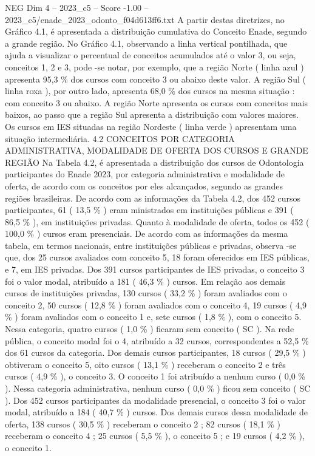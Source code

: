 \begin{textsample}{NEG Dim 4 – 2023\_c5 – Score -1.00 – 2023\_c5/enade\_2023\_odonto\_f04d613ff6.txt}
A partir destas diretrizes, no Gráfico 4.1, é apresentada a distribuição cumulativa do Conceito Enade, segundo a grande região.
No Gráfico 4.1, observando a linha vertical pontilhada, que ajuda a visualizar o percentual de conceitos acumulados até o valor 3, ou seja, conceitos 1, 2 e 3, pode -se notar, por exemplo, que a região Norte ( linha azul ) apresenta 95,3 \% dos cursos com conceito 3 ou abaixo deste valor.
A região Sul ( linha roxa ), por outro lado, apresenta 68,0 \% dos cursos na mesma situação : com conceito 3 ou abaixo.
A região Norte apresenta os cursos com conceitos mais baixos, ao passo que a região Sul apresenta a distribuição com valores maiores.
Os cursos em IES situadas na região Nordeste ( linha verde ) apresentam uma situação intermediária. 4.2 CONCEITOS POR CATEGORIA ADMINISTRATIVA, MODALIDADE DE OFERTA DOS CURSOS E GRANDE REGIÃO Na Tabela 4.2, é apresentada a distribuição dos cursos de Odontologia participantes do Enade 2023, por categoria administrativa e modalidade de oferta, de acordo com os conceitos por eles alcançados, segundo as grandes regiões brasileiras.
De acordo com as informações da Tabela 4.2, dos 452 cursos participantes, 61 ( 13,5 \% ) eram ministrados em instituições públicas e 391 ( 86,5 \% ), em instituições privadas.
Quanto à modalidade de oferta, todos os 452 ( 100,0 \% ) cursos eram presenciais.
De acordo com as informações da mesma tabela, em termos nacionais, entre instituições públicas e privadas, observa -se que, dos 25 cursos avaliados com conceito 5, 18 foram oferecidos em IES públicas, e 7, em IES privadas.
Dos 391 cursos participantes de IES privadas, o conceito 3 foi o valor modal, atribuído a 181 ( 46,3 \% ) cursos.
Em relação aos demais cursos de instituições privadas, 130 cursos ( 33,2 \% ) foram avaliados com o conceito 2, 50 cursos ( 12,8 \% ) foram avaliados com o conceito 4, 19 cursos ( 4,9 \% ) foram avaliados com o conceito 1 e, sete cursos ( 1,8 \% ), com o conceito 5.
Nessa categoria, quatro cursos ( 1,0 \% ) ficaram sem conceito ( SC ).
Na rede pública, o conceito modal foi o 4, atribuído a 32 cursos, correspondentes a 52,5 \% dos 61 cursos da categoria.
Dos demais cursos participantes, 18 cursos ( 29,5 \% ) obtiveram o conceito 5, oito cursos ( 13,1 \% ) receberam o conceito 2 e três cursos ( 4,9 \% ), o conceito 3.
O conceito 1 foi atribuído a nenhum curso ( 0,0 \% ).
Nessa categoria administrativa, nenhum curso ( 0,0 \% ) ficou sem conceito ( SC ).
Dos 452 cursos participantes da modalidade presencial, o conceito 3 foi o valor modal, atribuído a 184 ( 40,7 \% ) cursos.
Dos demais cursos dessa modalidade de oferta, 138 cursos ( 30,5 \% ) receberam o conceito 2 ; 82 cursos ( 18,1 \% ) receberam o conceito 4 ; 25 cursos ( 5,5 \% ), o conceito 5 ; e 19 cursos ( 4,2 \% ), o conceito 1.

\end{textsample}

